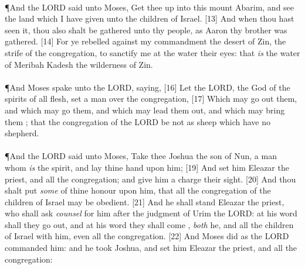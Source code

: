 \\
\P \textcolor[cmyk]{0.99998,1,0,0}{And the LORD said unto Moses, Get thee up into this mount Abarim, and see the land which I have given unto the children of Israel.}
[13] \textcolor[cmyk]{0.99998,1,0,0}{And when thou hast seen it, thou also shalt be gathered unto thy people, as Aaron thy brother was gathered.}
[14] \textcolor[cmyk]{0.99998,1,0,0}{For ye rebelled against my commandment  the desert of Zin,  the strife of the congregation, to sanctify me at the water  their eyes: that \emph{is} the water of Meribah  Kadesh  the wilderness of Zin.}\\
\\
\P \textcolor[cmyk]{0.99998,1,0,0}{And Moses spake unto the LORD, saying,}
[16] \textcolor[cmyk]{0.99998,1,0,0}{Let the LORD, the God of the spirits of all flesh, set a man over the congregation,}
[17] \textcolor[cmyk]{0.99998,1,0,0}{Which may go out  them, and which may go   them, and which may lead them out, and which may bring them ; that the congregation of the LORD be not as sheep which have no shepherd.}\\
\\
\P \textcolor[cmyk]{0.99998,1,0,0}{And the LORD said unto Moses, Take thee Joshua the son of Nun, a man  whom \emph{is} the spirit, and lay thine hand upon him;}
[19] \textcolor[cmyk]{0.99998,1,0,0}{And set him  Eleazar the priest, and  all the congregation; and give him a charge  their sight.}
[20] \textcolor[cmyk]{0.99998,1,0,0}{And thou shalt put \emph{some} of thine honour upon him, that all the congregation of the children of Israel may be obedient.}
[21] \textcolor[cmyk]{0.99998,1,0,0}{And he shall stand  Eleazar the priest, who shall ask \emph{counsel} for him after the judgment of Urim  the LORD: at his word shall they go out, and at his word they shall come , \emph{both} he, and all the children of Israel with him, even all the congregation.}
[22] \textcolor[cmyk]{0.99998,1,0,0}{And Moses did as the LORD commanded him: and he took Joshua, and set him  Eleazar the priest, and  all the congregation:}